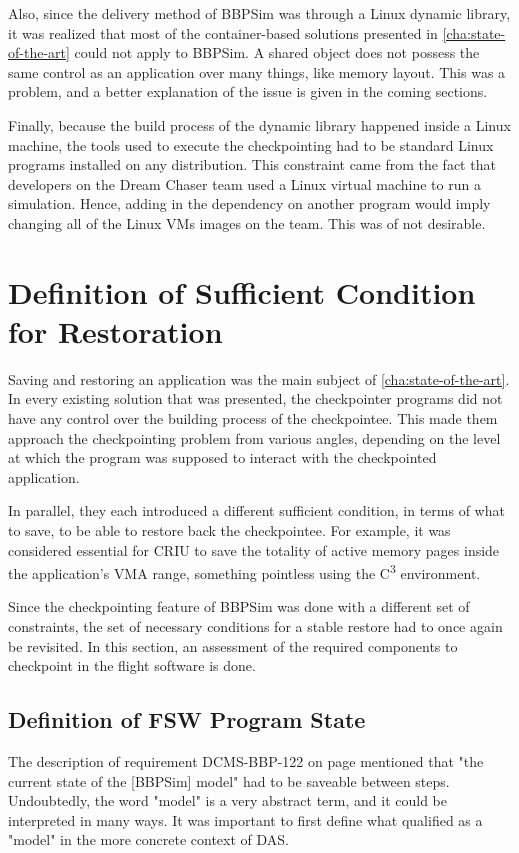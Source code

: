 {Also, since the delivery method of BBPSim was through a Linux dynamic library, it was realized that most of the container-based solutions presented in \autoref{cha:state-of-the-art} could not apply to BBPSim. A shared object does not possess the same control as an application over many things, like memory layout. This was a problem, and a better explanation of the issue is given in the coming sections.

Finally, because the build process of the dynamic library happened inside a Linux machine, the tools used to execute the checkpointing had to be standard Linux programs installed on any distribution. This constraint came from the fact that developers on the Dream Chaser team used a Linux virtual machine to run a simulation. Hence, adding in the dependency on another program would imply changing all of the Linux VMs images on the team. This was of not desirable.

\section{Definition of Sufficient Condition for Restoration}\label{sec:conditions}
Saving and restoring an application was the main subject of \autoref{cha:state-of-the-art}. In every existing solution that was presented, the checkpointer programs did not have any control over the building process of the checkpointee. This made them approach the checkpointing problem from various angles, depending on the level at which the program was supposed to interact with the checkpointed application. 

In parallel, they each introduced a different sufficient condition, in terms of what to save, to be able to restore back the checkpointee. For example, it was considered essential for CRIU to save the totality of active memory pages inside the application's \gls{VMA} range, something pointless using the C\textsuperscript{3} environment.

Since the checkpointing feature of BBPSim was done with a different set of constraints, the set of necessary conditions for a stable restore had to once again be revisited. In this section, an assessment of the required components to checkpoint in the flight software is done. 

\subsection*{Definition of FSW Program State}
The description of requirement DCMS-BBP-122 on page \pageref{tab:customer-reqs} mentioned that "the current state of the [BBPSim] model" had to be saveable between steps. Undoubtedly, the word "model" is a very abstract term, and it could be interpreted in many ways. It was important to first define what qualified as a "model" in the more concrete context of DAS.

}
